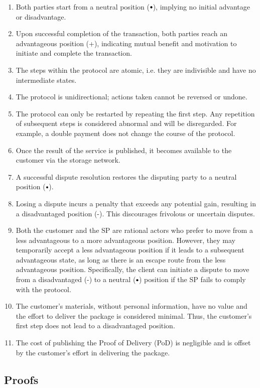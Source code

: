 \documentclass[pdftex,twocolumn,epjc3]{svjour3}
\newcommand{\plus}{+}
\newcommand{\minus}{-}
\newcommand\neutral[1][.75]{\mathbin{\ThisStyle{\vcenter{\hbox{%
  \scalebox{#1}{$\SavedStyle\bullet$}}}}}%
}
\begin{document}
\begin{enumerate}
\item Both parties start from a neutral position ($\neutral{}$), implying no initial advantage or disadvantage.
\item Upon successful completion of the transaction, both parties reach an advantageous position (\plus{}), indicating mutual benefit and motivation to initiate and complete the transaction.
\item The steps within the protocol are atomic, i.e. they are indivisible and have no intermediate states.
\item The protocol is unidirectional; actions taken cannot be reversed or undone.
\item The protocol can only be restarted by repeating the first step. Any repetition of subsequent steps is considered abnormal and will be disregarded. For example, a double payment does not change the course of the protocol.
\item Once the result of the service is published, it becomes available to the customer via the storage network.
\item A successful dispute resolution restores the disputing party to a neutral position ($\neutral{}$).
\item Losing a dispute incurs a penalty that exceeds any potential gain, resulting in a disadvantaged position (\minus{}). This discourages frivolous or uncertain disputes.
\item Both the customer and the SP are rational actors who prefer to move from a less advantageous to a more advantageous position. However, they may temporarily accept a less advantageous position if it leads to a subsequent advantageous state, as long as there is an escape route from the less advantageous position. Specifically, the client can initiate a dispute to move from a disadvantaged (\minus{}) to a neutral ($\neutral{}$) position if the SP fails to comply with the protocol.
\item The customer's materials, without personal information, have no value and the effort to deliver the package is considered minimal. Thus, the customer's first step does not lead to a disadvantaged position.
\item The cost of publishing the Proof of Delivery (PoD) is negligible and is offset by the customer's effort in delivering the package.
\end{enumerate}

\subsection{Proofs}\label{sec:proofs}
\end{document}
